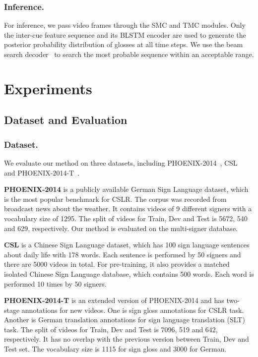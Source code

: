 \documentclass[letterpaper]{article} %
\begin{document}
\subsubsection{Inference.}
For inference, we pass video frames through the SMC and TMC modules. Only the inter-cue feature sequence and its BLSTM encoder are used to generate the posterior probability distribution of glosses at all time steps. We use the beam search decoder~\cite{deepspeech} to search the most probable sequence within an acceptable range.

\section{Experiments}
\subsection{Dataset and Evaluation}
\subsubsection{Dataset.}
We evaluate our method on three datasets, including PHOENIX-2014~\cite{phoenixdataset2014}, CSL~\cite{han,hlstm} and PHOENIX-2014-T~\cite{phoenix2014t}.

\textbf{PHOENIX-2014} is a publicly available German Sign Language dataset, which is the most popular benchmark for CSLR. The corpus was recorded from broadcast news about the weather. It contains videos of 9 different signers with a vocabulary size of 1295. The split of videos for Train, Dev and Test is 5672, 540 and 629, respectively. Our method is evaluated on the multi-signer database.

\textbf{CSL} is a Chinese Sign Language dataset, which has 100 sign language sentences about daily life with 178 words. Each sentence is performed by 50 signers and there are 5000 videos in total. For pre-training, it also provides a matched isolated Chinese Sign Language database,
which contains 500 words. Each word is performed 10 times by 50 signers.

\textbf{PHOENIX-2014-T} is an extended version of PHOENIX-2014 and has two-stage annotations for new videos.
One is sign gloss annotations for CSLR task. Another is German translation annotations for sign language translation (SLT) task. The split of videos for Train, Dev and Test is 7096, 519 and 642, respectively. It has no overlap with the previous version between Train, Dev and Test set. The vocabulary size is 1115 for sign gloss and 3000 for German.
\end{document}
